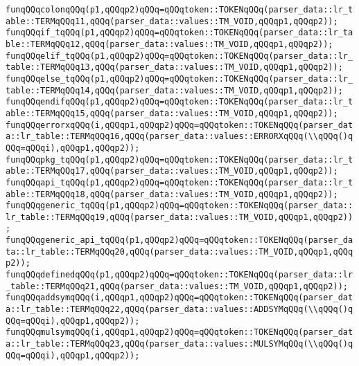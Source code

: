 \verb|funqQQqcolonqQQq(p1,qQQqp2)qQQq=qQQqtoken::TOKENqQQq(parser_data::lr_table::TERMqQQq11,qQQq(parser_data::values::TM_VOID,qQQqp1,qQQqp2));|\newline
\verb|funqQQqif_tqQQq(p1,qQQqp2)qQQq=qQQqtoken::TOKENqQQq(parser_data::lr_table::TERMqQQq12,qQQq(parser_data::values::TM_VOID,qQQqp1,qQQqp2));|\newline
\verb|funqQQqelif_tqQQq(p1,qQQqp2)qQQq=qQQqtoken::TOKENqQQq(parser_data::lr_table::TERMqQQq13,qQQq(parser_data::values::TM_VOID,qQQqp1,qQQqp2));|\newline
\verb|funqQQqelse_tqQQq(p1,qQQqp2)qQQq=qQQqtoken::TOKENqQQq(parser_data::lr_table::TERMqQQq14,qQQq(parser_data::values::TM_VOID,qQQqp1,qQQqp2));|\newline
\verb|funqQQqendifqQQq(p1,qQQqp2)qQQq=qQQqtoken::TOKENqQQq(parser_data::lr_table::TERMqQQq15,qQQq(parser_data::values::TM_VOID,qQQqp1,qQQqp2));|\newline
\verb|funqQQqerrorxqQQq(i,qQQqp1,qQQqp2)qQQq=qQQqtoken::TOKENqQQq(parser_data::lr_table::TERMqQQq16,qQQq(parser_data::values::ERRORXqQQq(\\qQQq()qQQq=qQQqi),qQQqp1,qQQqp2));|\newline
\verb|funqQQqpkg_tqQQq(p1,qQQqp2)qQQq=qQQqtoken::TOKENqQQq(parser_data::lr_table::TERMqQQq17,qQQq(parser_data::values::TM_VOID,qQQqp1,qQQqp2));|\newline
\verb|funqQQqapi_tqQQq(p1,qQQqp2)qQQq=qQQqtoken::TOKENqQQq(parser_data::lr_table::TERMqQQq18,qQQq(parser_data::values::TM_VOID,qQQqp1,qQQqp2));|\newline
\verb|funqQQqgeneric_tqQQq(p1,qQQqp2)qQQq=qQQqtoken::TOKENqQQq(parser_data::lr_table::TERMqQQq19,qQQq(parser_data::values::TM_VOID,qQQqp1,qQQqp2));|\newline
\verb|funqQQqgeneric_api_tqQQq(p1,qQQqp2)qQQq=qQQqtoken::TOKENqQQq(parser_data::lr_table::TERMqQQq20,qQQq(parser_data::values::TM_VOID,qQQqp1,qQQqp2));|\newline
\verb|funqQQqdefinedqQQq(p1,qQQqp2)qQQq=qQQqtoken::TOKENqQQq(parser_data::lr_table::TERMqQQq21,qQQq(parser_data::values::TM_VOID,qQQqp1,qQQqp2));|\newline
\verb|funqQQqaddsymqQQq(i,qQQqp1,qQQqp2)qQQq=qQQqtoken::TOKENqQQq(parser_data::lr_table::TERMqQQq22,qQQq(parser_data::values::ADDSYMqQQq(\\qQQq()qQQq=qQQqi),qQQqp1,qQQqp2));|\newline
\verb|funqQQqmulsymqQQq(i,qQQqp1,qQQqp2)qQQq=qQQqtoken::TOKENqQQq(parser_data::lr_table::TERMqQQq23,qQQq(parser_data::values::MULSYMqQQq(\\qQQq()qQQq=qQQqi),qQQqp1,qQQqp2));|\newline
